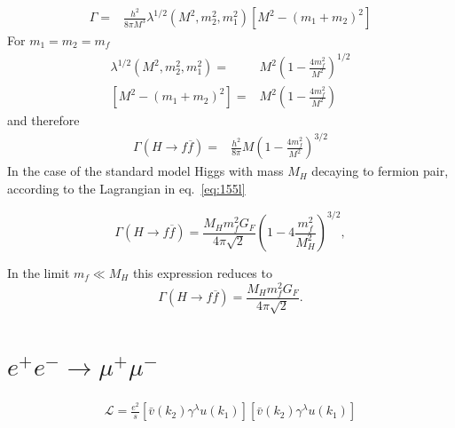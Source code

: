 \begin{align}
\Gamma=&\frac{h^2}{8 \pi M^3}\lambda^{1/2}(M^2,m_2^2,m_1^2)\left[M^2-(m_1+m_2)^2\right]
\end{align}
For $m_1=m_2=m_f$
\begin{align}
  \lambda^{1/2}(M^2,m_2^2,m_1^2)=&M^2\left(1-\frac{4m_f^2}{M^2}\right)^{1/2}\nonumber\\
\left[M^2-(m_1+m_2)^2\right]=&M^2\left(1-\frac{4m_f^2}{M^2}\right)
\end{align}
and therefore
\begin{align}
\Gamma(H\to f\overline{f})=&\frac{h^2}{8 \pi}M\left(1-\frac{4m_f^2}{M^2}\right)^{3/2}
\end{align}
In the case of the standard model Higgs with mass $M_H$ decaying to fermion pair, according to the Lagrangian in eq.~\eqref{eq:155l}

\begin{equation}
\Gamma(H\to f\overline{f})=\frac{M_{H}m_{f}^{2}G_{F}}{4\pi\sqrt{2}}
\left(1-4\frac{m^2_{f}}{M^2_{H}}\right)^{3/2}, 
\end{equation}

In the limit $m_{f}\ll M_{H}$ this expression reduces to 
\begin{equation}
\Gamma(H\to
f\overline{f})=\frac{M_{H}m_{f}^{2}G_{F}}{4\pi\sqrt{2}}. 
\end{equation}


\section{$e^+ e^- \to \mu^+\mu^-$}

\begin{align}
  \mathcal{L}=\frac{e^2}{s}
  \left[\bar v(k_2)\gamma^\lambda u(k_1)  \right]
  \left[\bar v(k_2)\gamma^\lambda u(k_1)  \right]
\end{align}


